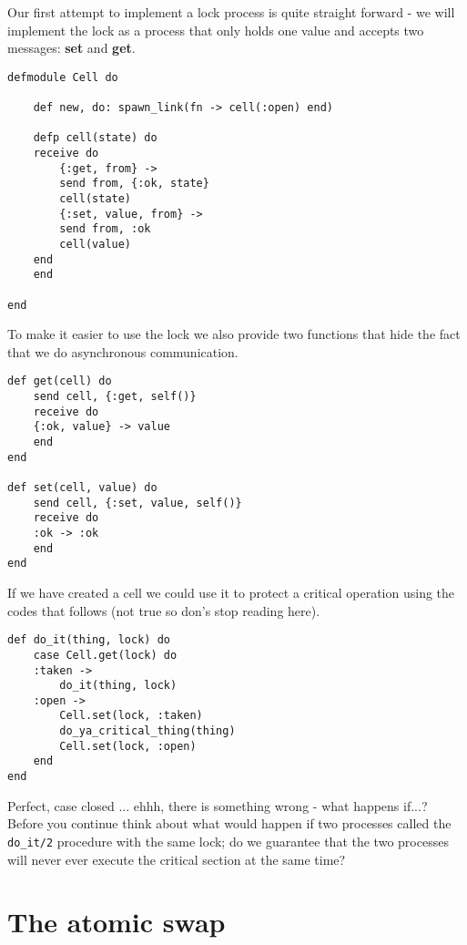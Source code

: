 \documentclass[a4paper,11pt]{article}
\begin{document}
Our first attempt to implement a lock process is quite straight forward
- we will implement the lock as a process that only holds one value
and accepts two messages: {\bf set} and {\bf get}.

\begin{verbatim}
defmodule Cell do

    def new, do: spawn_link(fn -> cell(:open) end)

    defp cell(state) do
    receive do
        {:get, from} ->
        send from, {:ok, state}
        cell(state)
        {:set, value, from} ->
        send from, :ok
        cell(value)
    end
    end
    
end
\end{verbatim}

To make it easier to use the lock we also provide two functions that
hide the fact that we do asynchronous communication.

\begin{verbatim}
def get(cell) do
    send cell, {:get, self()}
    receive do
    {:ok, value} -> value
    end
end

def set(cell, value) do
    send cell, {:set, value, self()}
    receive do
    :ok -> :ok
    end
end
\end{verbatim}

If we have created a cell we could use it to protect a critical
operation using the codes that follows (not true so don's stop
reading here).

\pagebreak

\begin{verbatim}
def do_it(thing, lock) do
    case Cell.get(lock) do
    :taken -> 
        do_it(thing, lock)
    :open ->
        Cell.set(lock, :taken)
        do_ya_critical_thing(thing)
        Cell.set(lock, :open)
    end
end
\end{verbatim}

Perfect, case closed ... ehhh, there is something wrong - what happens
if...? Before you continue think about what would happen if two
processes called the {\tt do\_it/2} procedure with the same lock; do we
guarantee that the two processes will never ever execute the critical
section at the same time?



\section{The atomic swap}
\end{document}
